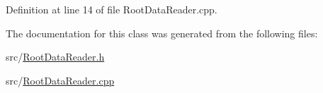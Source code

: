 Definition at line 14 of file Root\+Data\+Reader.\+cpp.



The documentation for this class was generated from the following files\+:\begin{DoxyCompactItemize}
\item 
src/\hyperlink{RootDataReader_8h}{Root\+Data\+Reader.\+h}\item 
src/\hyperlink{RootDataReader_8cpp}{Root\+Data\+Reader.\+cpp}\end{DoxyCompactItemize}
